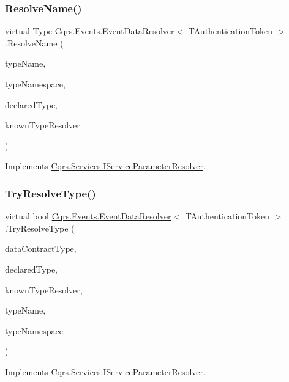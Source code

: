 \subsubsection{\texorpdfstring{Resolve\+Name()}{ResolveName()}}
{\footnotesize\ttfamily virtual Type \hyperlink{classCqrs_1_1Events_1_1EventDataResolver}{Cqrs.\+Events.\+Event\+Data\+Resolver}$<$ T\+Authentication\+Token $>$.Resolve\+Name (\begin{DoxyParamCaption}\item[{string}]{type\+Name,  }\item[{string}]{type\+Namespace,  }\item[{Type}]{declared\+Type,  }\item[{Data\+Contract\+Resolver}]{known\+Type\+Resolver }\end{DoxyParamCaption})\hspace{0.3cm}{\ttfamily [virtual]}}



Implements \hyperlink{interfaceCqrs_1_1Services_1_1IServiceParameterResolver_a37c4b53616192e4e2f15ab4661ab99ae}{Cqrs.\+Services.\+I\+Service\+Parameter\+Resolver}.

\mbox{\label{classCqrs_1_1Events_1_1EventDataResolver_a62be7cd15bb38f3a4054a62e787c473d}} 
\subsubsection{\texorpdfstring{Try\+Resolve\+Type()}{TryResolveType()}}
{\footnotesize\ttfamily virtual bool \hyperlink{classCqrs_1_1Events_1_1EventDataResolver}{Cqrs.\+Events.\+Event\+Data\+Resolver}$<$ T\+Authentication\+Token $>$.Try\+Resolve\+Type (\begin{DoxyParamCaption}\item[{Type}]{data\+Contract\+Type,  }\item[{Type}]{declared\+Type,  }\item[{Data\+Contract\+Resolver}]{known\+Type\+Resolver,  }\item[{out Xml\+Dictionary\+String}]{type\+Name,  }\item[{out Xml\+Dictionary\+String}]{type\+Namespace }\end{DoxyParamCaption})\hspace{0.3cm}{\ttfamily [virtual]}}



Implements \hyperlink{interfaceCqrs_1_1Services_1_1IServiceParameterResolver_a31c82a00b192b877faff6df99e1b689b}{Cqrs.\+Services.\+I\+Service\+Parameter\+Resolver}.

